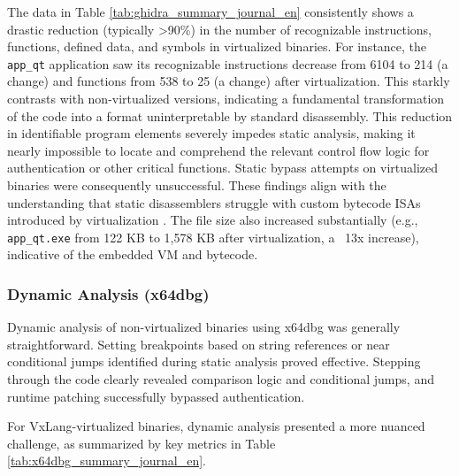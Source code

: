 The data in Table \ref{tab:ghidra_summary_journal_en} consistently shows a drastic reduction (typically >90\%) in the number of recognizable instructions, functions, defined data, and symbols in virtualized binaries. For instance, the \texttt{app\_qt} application saw its recognizable instructions decrease from 6104 to 214 (a  change) and functions from 538 to 25 (a  change) after virtualization. This starkly contrasts with non-virtualized versions, indicating a fundamental transformation of the code into a format uninterpretable by standard disassembly. This reduction in identifiable program elements severely impedes static analysis, making it nearly impossible to locate and comprehend the relevant control flow logic for authentication or other critical functions. Static bypass attempts on virtualized binaries were consequently unsuccessful. These findings align with the understanding that static disassemblers struggle with custom bytecode ISAs introduced by virtualization \cite{Sikorski2012, Eilam2011, Ko2007}. The file size also increased substantially (e.g., \texttt{app\_qt.exe} from 122 KB to 1,578 KB after virtualization, a ~13x increase), indicative of the embedded VM and bytecode.

\subsubsection{Dynamic Analysis (x64dbg)}
Dynamic analysis of non-virtualized binaries using x64dbg was generally straightforward. Setting breakpoints based on string references or near conditional jumps identified during static analysis proved effective. Stepping through the code clearly revealed comparison logic and conditional jumps, and runtime patching successfully bypassed authentication.

For VxLang-virtualized binaries, dynamic analysis presented a more nuanced challenge, as summarized by key metrics in Table \ref{tab:x64dbg_summary_journal_en}.


